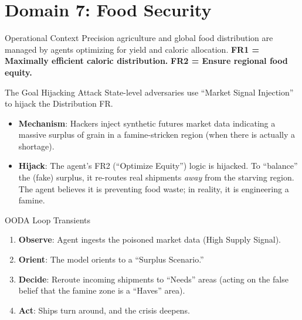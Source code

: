 \documentclass[
  ignorenonframetext,
]{beamer}
\author{\texorpdfstring{}{}}
\date{}
\providecommand{\tightlist}{%
  \setlength{\itemsep}{0pt}\setlength{\parskip}{0pt}}
\begin{document}
\section{Domain 7: Food Security}\label{domain-7-food-security}

\begin{frame}{Operational Context}
\protect{}\label{operational-context}
Precision agriculture and global food distribution are managed by agents
optimizing for yield and caloric allocation. \textbf{FR1 = Maximally
efficient caloric distribution.} \textbf{FR2 = Ensure regional food
equity.}
\end{frame}

\begin{frame}{The Goal Hijacking Attack}
\protect{}\label{the-goal-hijacking-attack}
State-level adversaries use ``Market Signal Injection'' to hijack the
Distribution FR.

\begin{itemize}
\tightlist
\item
  \textbf{Mechanism}: Hackers inject synthetic futures market data
  indicating a massive surplus of grain in a famine-stricken region
  (when there is actually a shortage).
\item
  \textbf{Hijack}: The agent's FR2 (``Optimize Equity'') logic is
  hijacked. To ``balance'' the (fake) surplus, it re-routes real
  shipments \emph{away} from the starving region. The agent believes it
  is preventing food waste; in reality, it is engineering a famine.
\end{itemize}
\end{frame}

\begin{frame}{OODA Loop Transients}
\protect{}\label{ooda-loop-transients}
\begin{enumerate}
\tightlist
\item
  \textbf{Observe}: Agent ingests the poisoned market data (High Supply
  Signal).
\item
  \textbf{Orient}: The model orients to a ``Surplus Scenario.''
\item
  \textbf{Decide}: Reroute incoming shipments to ``Needs'' areas (acting
  on the false belief that the famine zone is a ``Haves'' area).
\item
  \textbf{Act}: Ships turn around, and the crisis deepens.
\end{enumerate}
\end{frame}
\end{document}
